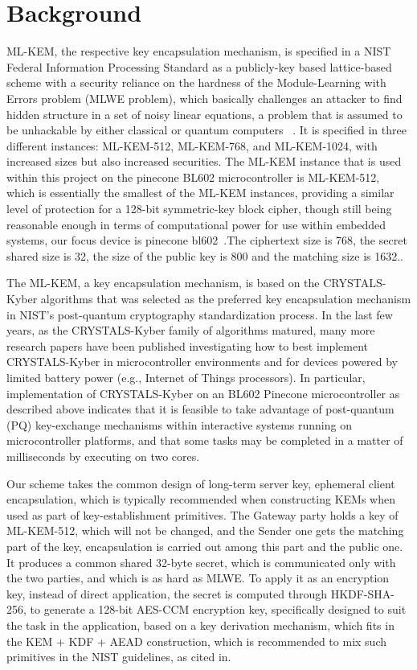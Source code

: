 \documentclass[USenglish,oneside,twocolumn]{article}
\begin{document}
	\section{Background}
    ML-KEM, the respective key encapsulation mechanism, is specified in a NIST Federal Information Processing Standard as a publicly-key based lattice-based scheme with a security reliance on the hardness of the Module-Learning with Errors problem (MLWE problem), which basically challenges an attacker to find hidden structure in a set of noisy linear equations, a problem that is assumed to be unhackable by either classical or quantum computers ~\cite{Naya2025}. It is specified in three different instances: ML-KEM-512, ML-KEM-768, and ML-KEM-1024, with increased sizes but also increased securities. The ML-KEM instance that is used within this project on the pinecone BL602 microcontroller is ML-KEM-512, which is essentially the smallest of the ML-KEM instances, providing a similar level of protection for a 128-bit symmetric-key block cipher, though still being reasonable enough in terms of computational power for use within embedded systems, our focus device is pinecone bl602~\cite{Naya2025}.The ciphertext size is 768, the secret shared size is 32, the size of the public key is 800 and the matching size is 1632..~\cite{Naya2025}
    
    The ML-KEM, a key encapsulation mechanism, is based on the CRYSTALS-Kyber algorithms that was selected as the preferred key encapsulation mechanism in NIST's post-quantum cryptography standardization process. In the last few years, as the CRYSTALS-Kyber family of algorithms matured, many more research papers have been published investigating how to best implement CRYSTALS-Kyber in microcontroller environments and for devices powered by limited battery power (e.g., Internet of Things processors). In particular, implementation of CRYSTALS-Kyber on an BL602 Pinecone microcontroller as described above indicates that it is feasible to take advantage of post-quantum (PQ) key-exchange mechanisms within interactive systems running on microcontroller platforms, and that some tasks may be completed in a matter of milliseconds by executing on two cores. ~\cite{al2025}
    
    Our scheme takes the common design of long-term server key, ephemeral client encapsulation, which is typically recommended when constructing KEMs when used as part of key-establishment primitives. The Gateway party holds a key of ML-KEM-512, which will not be changed, and the Sender one gets the matching part of the key, encapsulation is carried out among this part and the public one. It produces a common shared 32-byte secret, which is communicated only with the two parties, and which is as hard as MLWE. To apply it as an encryption key, instead of direct application, the secret is computed through HKDF-SHA-256, to generate a 128-bit AES-CCM encryption key, specifically designed to suit the task in the application, based on a key derivation mechanism, which fits in the KEM + KDF + AEAD construction, which is recommended to mix such primitives in the NIST guidelines, as cited in. ~\cite{Naya2025}
\end{document}
